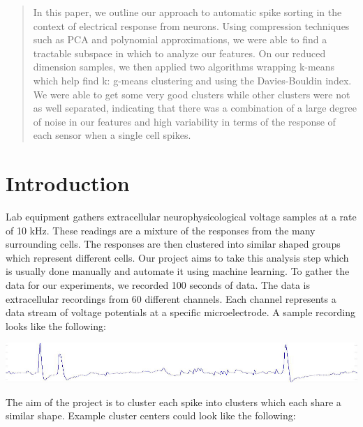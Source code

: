 \documentclass{acm_proc_article-sp}
\begin{document}
\maketitle
\begin{abstract}
In this paper, we outline our approach to automatic spike sorting in the
context of electrical response from neurons. Using compression techniques
such as PCA and polynomial approximations, we were able to find a
tractable subspace in which to analyze our features. On our reduced
dimension samples, we then applied two algorithms wrapping k-means which
help find k: g-means clustering and using the Davies-Bouldin index. We
were able to get some 
very good clusters while other clusters were not as well separated,
indicating that there was a combination of a large degree of noise in our
features and high variability in terms of the response of each sensor when
a single cell spikes.

\end{abstract}

\section{Introduction}

Lab equipment gathers extracellular neurophysicological voltage samples at
a rate of 10 kHz. These readings are a mixture of the responses from the
many surrounding cells. The responses are then clustered into
similar shaped groups which represent different cells. Our
project aims to take this analysis step which is usually done
manually and automate it using machine learning. To gather the data for
our experiments, we recorded 100 seconds of data. The data is
extracellular recordings from 60 different channels. Each channel 
represents a data stream of voltage potentials at a specific microelectrode. A sample
recording looks like the following:

\begin{center}
  \includegraphics[width=0.8\linewidth]{../poster/images/voltagetrace_2_small.jpg}
\end{center}

The aim of the project is to cluster each spike into clusters
which each share a similar shape.  Example cluster centers
could look like the following:
\end{document}
